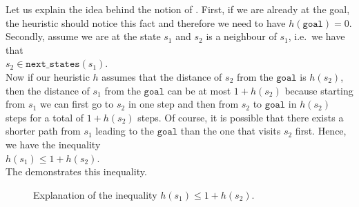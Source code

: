 Let us explain the idea behind the notion of .  First, if we are already at the goal, the heuristic
should notice this fact and therefore we need to have $h(\mathtt{goal}) = 0$.  Secondly, assume we are at the state
$s_1$ and $s_2$ is a neighbour of $s_1$, i.e.~we have that
\\[0.2cm]
\hspace*{1.3cm}
$s_2 \in \mathtt{next\_states}(s_1)$.
\\[0.2cm]
Now if our heuristic $h$ assumes that the distance of $s_2$ from the $\texttt{goal}$ is $h(s_2)$, then the distance of
$s_1$ from the $\texttt{goal}$ can be at most $1 + h(s_2)$ because starting from $s_1$ we can first go to $s_2$
in one step and then from $s_2$ to $\texttt{goal}$ in $h(s_2)$ steps for a total of $1 + h(s_2)$ steps.  Of
course, it is possible that there exists a shorter path from $s_1$ leading to the $\texttt{goal}$ than the one
that visits $s_2$ first.  Hence, we have the inequality
\\[0.2cm]
\hspace*{1.3cm}
$h(s_1) \leq 1 + h(s_2)$.
\\[0.2cm]
The  demonstrates this inequality.

\begin{figure}[!ht]
    \centering
    \caption{Explanation of the inequality $h(s_1) \leq 1 + h(s_2)$.}
    \label{fig:demonstration-heuristic.tikz}
\end{figure}

